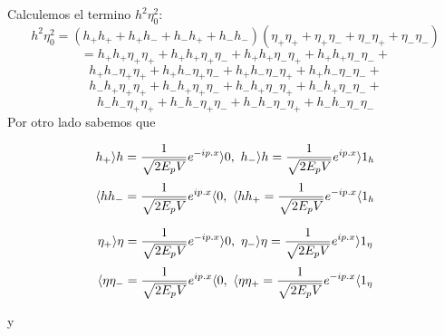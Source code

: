 Calculemos  el termino $h^{2}\eta_{0}^{2}$:
\begin{equation*}
h^{2}\eta_{0}^{2}=(h_{+}h_{+}+h_{+}h_{-}+h_{-}h_{+}+h_{-}h_{-})(\eta_{+}\eta_{+}+\eta_{+}\eta_{-}+\eta_{-}\eta_{+}+\eta_{-}\eta_{-})
\end{equation*}
\begin{equation*}
=h_{+}h_{+}\eta_{+}\eta_{+}+h_{+}h_{+}\eta_{+}\eta_{-}+h_{+}h_{+}\eta_{-}\eta_{+}+h_{+}h_{+}\eta_{-}\eta_{-}+
\end{equation*}
\begin{equation*}
h_{+}h_{-}\eta_{+}\eta_{+}+h_{+}h_{-}\eta_{+}\eta_{-}+h_{+}h_{-}\eta_{-}\eta_{+}+h_{+}h_{-}\eta_{-}\eta_{-}+
\end{equation*}
\begin{equation*}
h_{-}h_{+}\eta_{+}\eta_{+}+h_{-}h_{+}\eta_{+}\eta_{-}+h_{-}h_{+}\eta_{-}\eta_{+}+h_{-}h_{+}\eta_{-}\eta_{-}+
\end{equation*}
\begin{equation}
h_{-}h_{-}\eta_{+}\eta_{+}+h_{-}h_{-}\eta_{+}\eta_{-}+h_{-}h_{-}\eta_{-}\eta_{+}+h_{-}h_{-}\eta_{-}\eta_{-}
\label{10}
\end{equation}
 Por otro lado  sabemos que 
 
 \begin{equation}
 h_{+}\rangle{h}=\frac{1}{\sqrt{2E_{p}V}}e^{-ip.x}\rangle0 ,\ h_{-}\rangle{h}=\frac{1}{\sqrt{2E_{p}V}}e^{ip.x}\rangle{1_{h}}
 \label{11}
 \end{equation}
 \begin{equation}
 \langle h h_{-}=\frac{1}{\sqrt{2E_{p}V}}e^{ip.x}\langle{0} ,\ \langle h h_{+}=\frac{1}{\sqrt{2E_{p}V}}e^{-ip.x}\langle{1_{h}}
 \label{12}
 \end{equation}


\begin{equation}
 \eta_{+}\rangle{\eta}=\frac{1}{\sqrt{2E_{p}V}}e^{-ip.x}\rangle0 ,\ \eta_{-}\rangle{\eta}=\frac{1}{\sqrt{2E_{p}V}}e^{ip.x}\rangle{1_{\eta}}
 \label{13}
 \end{equation}
 \begin{equation}
 \langle \eta \eta_{-}=\frac{1}{\sqrt{2E_{p}V}}e^{ip.x}\langle{0} ,\ \langle \eta \eta_{+}=\frac{1}{\sqrt{2E_{p}V}}e^{-ip.x}\langle {1_{\eta}}
 \label{14}
 \end{equation}
 
 y
 
